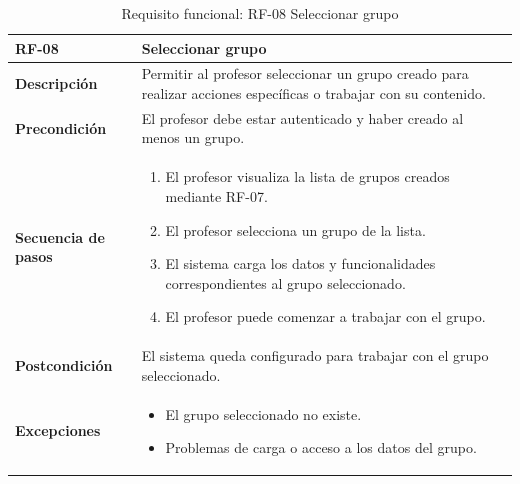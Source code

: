 \begin{table}[H]
\centering
\begin{tabularx}{\textwidth}{
  |>{\centering\arraybackslash}l
  |>{\centering\arraybackslash}X|}
\hline
\textbf{RF-08} & \textbf{Seleccionar grupo} \\ \hline

\textbf{Descripción} & Permitir al profesor seleccionar un grupo creado para realizar acciones específicas o trabajar con su contenido. \\ \hline

\textbf{Precondición} & El profesor debe estar autenticado y haber creado al menos un grupo. \\ \hline

\textbf{Secuencia de pasos} & 
\begin{enumerate}
  \item El profesor visualiza la lista de grupos creados mediante RF-07.
  \item El profesor selecciona un grupo de la lista.
  \item El sistema carga los datos y funcionalidades correspondientes al grupo seleccionado.
  \item El profesor puede comenzar a trabajar con el grupo.
\end{enumerate} \\ \hline

\textbf{Postcondición} & El sistema queda configurado para trabajar con el grupo seleccionado. \\ \hline

\textbf{Excepciones} & 
\begin{itemize}
  \item El grupo seleccionado no existe.
  \item Problemas de carga o acceso a los datos del grupo.
\end{itemize} \\ \hline
\end{tabularx}
\caption{Requisito funcional: RF-08 Seleccionar grupo}
\end{table}
